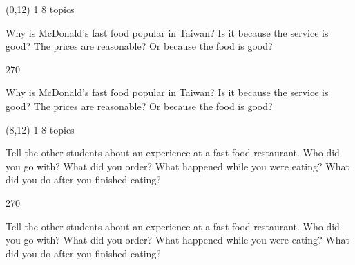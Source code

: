 \documentclass[a4paper]{article}
\newenvironment{itemize*}%
{\begin{itemize}%
 \setlength{\itemsep}{0.5cm}%
 \setlength{\parsep}{0pt}%
 \setlength{\parskip}{0pt}}%
{\end{itemize}}
\newcommand{\mycard}[3]{%
	\small #1 #2
	\par
	\parbox[t][6.8cm][c]{9.5cm}{%
	\par
	\myleft{#3}
	\par
	\myright{#3}
	}
}
\newcommand{\myleft}[1]{%
	\begin{sideways}
	\hspace*{-0.9cm}
		\parbox[t][2.7cm][t]{6.5cm}{%
		\large #1
		}
	\end{sideways}
}
\newcommand{\myright}[1]{%
	\hspace*{6.5cm}
	\begin{turn}{270}
	\hspace*{-7.1cm}
		\parbox[t][2.7cm][t]{6.5cm}{%
		\large #1
		}
	\end{turn}
}
\begin{document}
\begin{textblock}{8}(0,12)
\mycard{1}{8 topics}{
\begin{itemize*}
\item Why is McDonald's fast food popular in Taiwan? Is it because the service is good? The prices are reasonable? Or because the food is good?
\end{itemize*}
}
\end{textblock}

\begin{textblock}{8}(8,12)
\mycard{1}{8 topics}{
\begin{itemize*}
\item Tell the other students about an experience at a fast food restaurant. Who did you go with? What did you order? What happened while you were eating? What did you do after you finished eating?
\end{itemize*}
}
\end{textblock}

\null
\newpage
\end{document}
